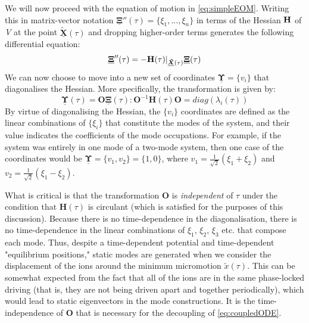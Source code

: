 \documentclass{article}
\begin{document}
\medskip
\noindent We will now proceed with the equation of motion in \eqref{eq:simpleEOM}. Writing this in matrix-vector notation $ \underline{\boldsymbol{\Xi}}'' (\tau) = \{ \xi_1, ..., \xi_n \} $ in terms of the Hessian $\bf{H}$ of \textit{V} at the point $\underline{\boldsymbol{\tilde{X}}} (\tau)$ and dropping higher-order terms generates the following differential equation:
\begin{equation}
	\underline{\boldsymbol{\Xi}}'' (\tau) = - \bf{H} (\tau) |_{\underline{\boldsymbol{\tilde{X}}} (\tau)} \underline{\boldsymbol{\Xi}} (\tau)
	\label{eq:coupledODE}
\end{equation}
We can now choose to move into a new set of coordinates $\underline{\boldsymbol{\Upsilon}} = \{ v_i \}$ that diagonalises the Hessian. More specifically, the transformation is given by:
\begin{equation}
	\underline{\boldsymbol{\Upsilon}} (\tau) = \textbf{O} \underline{\boldsymbol{\Xi}} (\tau) : \textbf{O}^{-1} \textbf{H} (\tau) \textbf{O} = diag(\lambda_i (\tau))
	\label{eq:transformation}
\end{equation}
By virtue of diagonalising the Hessian, the $\{ v_i \}$ coordinates are defined as the linear combinations of $\{ \xi_i \}$ that constitute the modes of the system, and their value indicates the coefficients of the mode occupations. For example, if the system was entirely in one mode of a two-mode system, then one case of the coordinates would be $\underline{\boldsymbol{\Upsilon}} = \{ v_1, v_2 \} = \{ 1, 0 \}$, where $v_1 = \frac{1}{\sqrt{2}}(\xi_1 + \xi_2)$ and $v_2 = \frac{1}{\sqrt{2}}(\xi_1 - \xi_2)$. \par
\medskip
\noindent What is critical is that the transformation $\textbf{O}$ is \textit{independent} of $\tau$ under the condition that $\textbf{H} (\tau)$ is circulant (which is satisfied for the purposes of this discussion). Because there is no time-dependence in the diagonalisation, there is no time-dependence in the linear combinations of $\xi_1$, $\xi_2$, $\xi_3$ etc. that compose each mode. Thus, despite a time-dependent potential and time-dependent "equilibrium positions," static modes are generated when we consider the displacement of the ions around the minimum micromotion $\tilde{x} (\tau)$. This can be somewhat expected from the fact that all of the ions are in the same phase-locked driving (that is, they are not being driven apart and together periodically), which would lead to static eigenvectors in the mode constructions. It is the time-independence of $\textbf{O}$ that is necessary for the decoupling of \eqref{eq:coupledODE}.
\end{document}

